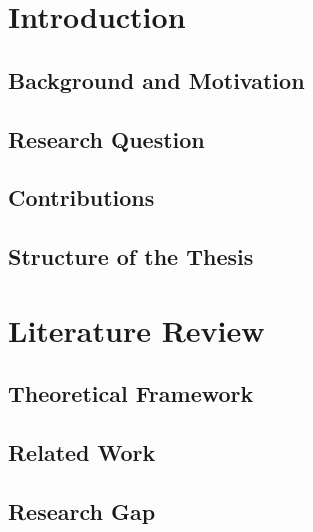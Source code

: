\documentclass[12pt,a4paper]{report}
\theoremstyle{definition}
\begin{document}
\listoftables
\newpage

\setcounter{page}{1}

\chapter{Introduction}
\label{chap:introduction}

\section{Background and Motivation}
\label{sec:background}

\section{Research Question}
\label{sec:research_question}

\section{Contributions}
\label{sec:contributions}

\section{Structure of the Thesis}
\label{sec:structure}

\chapter{Literature Review}
\label{chap:literature}

\section{Theoretical Framework}
\label{sec:theoretical_framework}

\section{Related Work}
\label{sec:related_work}

\section{Research Gap}
\label{sec:research_gap}
\end{document}
